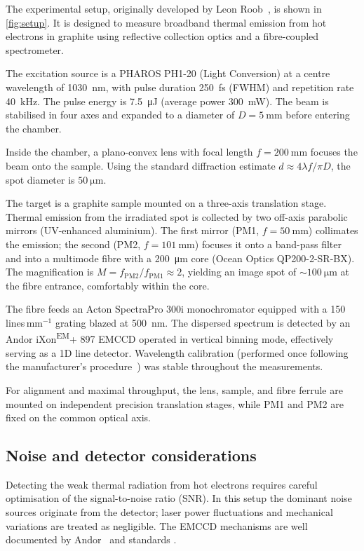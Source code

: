 \documentclass[
	parskip=half,
	a4paper,
]{scrarticle}
\begin{document}
The experimental setup, originally developed by Leon Roob~\cite{roobThermalRadiationUltrafast2025}, is shown in \autoref{fig:setup}. It is designed to measure broadband thermal emission from hot electrons in graphite using reflective collection optics and a fibre-coupled spectrometer.

The excitation source is a PHAROS PH1-20 (Light Conversion) at a centre wavelength of \SI{1030}{\nano\metre}, with pulse duration \SI{250}{\femto\second} (FWHM) and repetition rate \SI{40}{\kilo\hertz}. The pulse energy is \SI{7.5}{\micro\joule} (average power \SI{300}{\milli\watt}). The beam is stabilised in four axes and expanded to a diameter of $D=\SI{5}{\milli\metre}$ before entering the chamber.

Inside the chamber, a plano-convex lens with focal length \(f=\SI{200}{\milli\metre}\) focuses the beam onto the sample. Using the standard diffraction estimate \(d \approx 4\lambda f / \pi D\), the spot diameter is \(\SI{50}{\micro\metre}\).

The target is a graphite sample mounted on a three-axis translation stage. Thermal emission from the irradiated spot is collected by two off-axis parabolic mirrors (UV-enhanced aluminium). The first mirror (PM1, \(f=\SI{50}{\milli\metre}\)) collimates the emission; the second (PM2, \(f=\SI{101}{\milli\metre}\)) focuses it onto a band-pass filter and into a multimode fibre with a \SI{200}{\micro\metre} core (Ocean Optics QP200-2-SR-BX). The magnification is \(M = f_{\mathrm{PM2}}/f_{\mathrm{PM1}} \approx 2\), yielding an image spot of \(\sim\SI{100}{\micro\metre}\) at the fibre entrance, comfortably within the core.

The fibre feeds an Acton SpectraPro 300i monochromator equipped with a 150\,lines\,mm\(^{-1}\) grating blazed at \SI{500}{\nano\metre}. The dispersed spectrum is detected by an Andor iXon\textsuperscript{EM}+ 897 EMCCD operated in vertical binning mode, effectively serving as a 1D line detector.
Wavelength calibration (performed once following the manufacturer’s procedure~\cite{roobThermalRadiationUltrafast2025}) was stable throughout the measurements.

For alignment and maximal throughput, the lens, sample, and fibre ferrule are mounted on independent precision translation stages, while PM1 and PM2 are fixed on the common optical axis. 

\subsection{Noise and detector considerations}
Detecting the weak thermal radiation from hot electrons requires careful optimisation of the signal-to-noise ratio (SNR). In this setup the dominant noise sources originate from the detector; laser power fluctuations and mechanical variations are treated as negligible. The EMCCD mechanisms are well documented by Andor~\cite{dr.jowaltersSensitivityNoiseCCD2023,andorEstablishingSensitivityScientifica} and standards \cite{europeanmachinevisionassociationStandardCharacterizationImage2010}.
\end{document}
